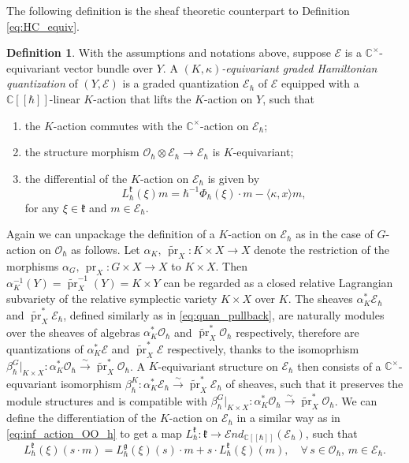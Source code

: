 \documentclass[12pt]{amsart}
\newcommand{\C}{\mathbb{C}}
\newcommand{\g}{\mathfrak{g}}
\newcommand{\kf}{\mathfrak{k}}
\newcommand{\send}{\mathcal{E}nd}
\newcommand{\pr}{\operatorname{pr}}
\newcommand{\cm}{\C^\times}
\newcommand{\OO}{\mathcal{O}}
\newcommand{\wt}{\widetilde}
\newcommand{\EE}{\mathcal{E}}
\theoremstyle{definition}
\newtheorem{defi}[Thm]{Definition}
\numberwithin{equation}{section}
\begin{document}
The following definition is the sheaf theoretic counterpart to Definition \ref{eq:HC_equiv}.

\begin{defi}\label{defi:equiv_quant_modules}
	With the assumptions and notations above, suppose $\EE$ is a $\cm$-equivariant vector bundle over $Y$. A {\it $(K,\kappa)$-equivariant graded Hamiltonian quantization} of $(Y,\EE)$ is a graded quantization $\EE_\hbar$ of $\EE$ equipped with a $\C[[\hbar]]$-linear $K$-action that lifts the $K$-action on $Y$, such that
	\begin{enumerate}
		\item the $K$-action commutes with the $\cm$-action on $\EE_\hbar$;
		\item the structure morphism $\OO_\hbar \otimes \EE_\hbar \to \EE_\hbar$ is $K$-equivariant;
		\item the differential of the $K$-action on $\EE_\hbar$ is given by
		\[ L_\hbar^\kf(\xi) m = \hbar^{-1} \Phi_\hbar(\xi) \cdot m - \langle\kappa,x\rangle m,\]
		for any $\xi \in \kf$ and $m \in \EE_\hbar$.
	\end{enumerate}
\end{defi}

Again we can unpackage the definition of a $K$-action on $\EE_\hbar$ as in the case of $G$-action on $\OO_\hbar$ as follows. Let $\alpha_K, \, \wt{\pr}_X : K \times X \to X$ denote the restriction of the morphisms $\alpha_G, \, \pr_X : G \times X \to X$ to $K \times X$. Then $\alpha_K^{-1}(Y) = \wt{\pr}_X^{-1}(Y) = K \times Y$ can be regarded as a closed relative Lagrangian subvariety of the relative symplectic variety $K \times X$ over $K$. The sheaves $\alpha_K^* \EE_\hbar$ and $\wt{\pr}_X^* \EE_\hbar$, defined similarly as in \eqref{eq:quan_pullback}, are naturally modules over the sheaves of algebras $\alpha_K^* \OO_\hbar$ and $\wt{\pr}_X^* \OO_\hbar$ respectively, therefore are quantizations of $\alpha_K^* \EE$ and $\wt{\pr}_X^* \EE$ respectively, thanks to the isomoprhism $\beta_\hbar^G |_{K \times X}: \alpha_K^* \OO_\hbar \xrightarrow{\sim} \wt{\pr}_X^* \OO_\hbar$. A $K$-equivariant structure on $\EE_\hbar$ then consists of a $\cm$-equvariant isomorphism $\beta^K_\hbar: \alpha_K^* \EE_\hbar \xrightarrow{\sim} \wt{\pr}_X^* \EE_\hbar$ of sheaves, such that it preserves the module structures and is compatible with $\beta_\hbar^G |_{K \times X}: \alpha_K^* \OO_\hbar \xrightarrow{\sim} \wt{\pr}_X^* \OO_\hbar$. We can define the differentiation of the $K$-action on $\EE_\hbar$ in a similar way as in \eqref{eq:inf_action_OO_h} to get a map $L_\hbar^\kf: \kf \to \send_{\C[[\hbar]]}(\EE_\hbar)$, such that
\[ L_\hbar^\kf (\xi) ( s \cdot m) = L_\hbar^\g(\xi) (s) \cdot m + s \cdot L_\hbar^\kf(\xi) ( m ), \quad \forall \, s \in \OO_\hbar, \, m \in \EE_\hbar. \]
\end{document}
